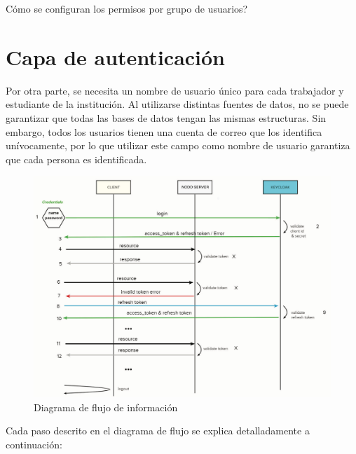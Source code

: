  

Cómo se configuran los permisos por grupo de usuarios?

\section*{Capa de autenticación}


Por otra parte, se necesita un nombre de usuario único para cada trabajador y estudiante de la institución. Al utilizarse distintas fuentes de datos, no se puede garantizar que todas las bases de datos tengan las mismas estructuras. Sin embargo, todos los usuarios tienen una cuenta de correo que los identifica unívocamente, por lo que utilizar este campo como nombre de usuario garantiza que cada persona es identificada.

\begin{figure}[H]
	\centering	
	\hspace*{-0.3in}
	\includegraphics[width=1.1\linewidth]{"Graphics/diagrama de flujo del prototipo del servicio"}
	\caption{Diagrama de flujo de información}
	\label{fig:diagrama-de-flujo-del-prototipo-del-servicio}
\end{figure}

Cada paso descrito en el diagrama de flujo se explica detalladamente a continuación: 

